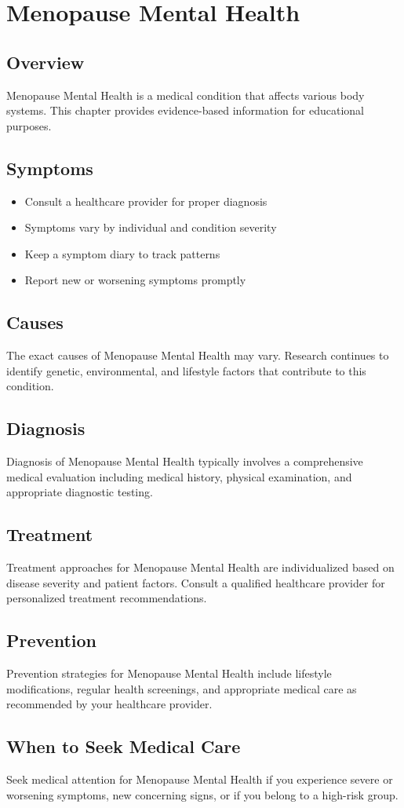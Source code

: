 \chapter{Menopause Mental Health}

\section*{Overview}
Menopause Mental Health is a medical condition that affects various body systems. This chapter provides evidence-based information for educational purposes.

\section*{Symptoms}
\begin{itemize}
  \item Consult a healthcare provider for proper diagnosis
  \item Symptoms vary by individual and condition severity
  \item Keep a symptom diary to track patterns
  \item Report new or worsening symptoms promptly
\end{itemize}

\section*{Causes}
The exact causes of Menopause Mental Health may vary. Research continues to identify genetic, environmental, and lifestyle factors that contribute to this condition.

\section*{Diagnosis}
Diagnosis of Menopause Mental Health typically involves a comprehensive medical evaluation including medical history, physical examination, and appropriate diagnostic testing.

\section*{Treatment}
Treatment approaches for Menopause Mental Health are individualized based on disease severity and patient factors. Consult a qualified healthcare provider for personalized treatment recommendations.

\section*{Prevention}
Prevention strategies for Menopause Mental Health include lifestyle modifications, regular health screenings, and appropriate medical care as recommended by your healthcare provider.

\section*{When to Seek Medical Care}
Seek medical attention for Menopause Mental Health if you experience severe or worsening symptoms, new concerning signs, or if you belong to a high-risk group.
\clearpage
